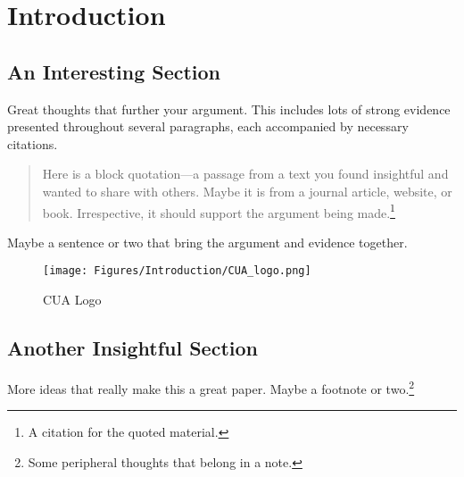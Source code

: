 \chapter{Introduction}
\label{chapter:introduction}

\section{An Interesting Section}
\label{section:interesting_section}

Great thoughts that further your argument. This includes lots of strong evidence presented throughout several paragraphs, each accompanied by necessary citations.
\begin{quotation}
    \noindent Here is a block quotation---a passage from a text you found insightful and wanted to share with others. Maybe it is from a journal article, website, or book. Irrespective, it should support the argument being made.\footnote{A citation for the quoted material.}
\end{quotation}
Maybe a sentence or two that bring the argument and evidence together.\citep{dos_santos_2020}

\begin{figure} [ht]
\centering
         \texttt{[image: Figures/Introduction/CUA\_logo.png]}
         \caption{CUA Logo}
         \label{CUA-logo-1}
\end{figure}


\section{Another Insightful Section}
\label{section:another_interesting_section}

More ideas that really make this a great paper. Maybe a footnote or two.\footnote{Some peripheral thoughts that belong in a note.}

